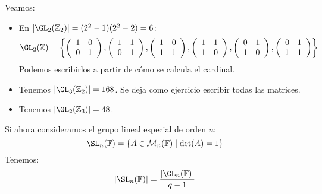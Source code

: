 \begin{ejemplo}
    Veamos:
    \begin{itemize}
        \item En $|\GL_2(\mathbb{Z}_2)| = (2^2 - 1)(2^2-2) = 6$:
            \begin{equation*}
                \GL_2(\mathbb{Z}) = \left\{\left(\begin{array}{cc}
                    1 & 0 \\
                    0 & 1 
                \end{array}\right), \left(\begin{array}{cc}
                    1 & 1 \\
                    0 & 1 
                \end{array}\right),\left(\begin{array}{cc}
                    1 & 0 \\
                    1 & 1 
                \end{array}\right), \left(\begin{array}{cc}
                    1 & 1 \\
                    1 & 0 
                \end{array}\right),\left(\begin{array}{cc}
                    0 & 1 \\
                    1 & 0 
                \end{array}\right), \left(\begin{array}{cc}
                    0 & 1 \\
                    1 & 1 
                \end{array}\right)\right\}
            \end{equation*}
            Podemos escribirlos a partir de cómo se calcula el cardinal.
        \item Tenemos $|\GL_3(\mathbb{Z}_2)| = 168$. Se deja como ejercicio escribir todas las matrices.
        \item Tenemos $|\GL_2(\mathbb{Z}_3)| = 48$.
    \end{itemize}
\end{ejemplo}

Si ahora consideramos el grupo lineal especial de orden $n$:
\begin{equation*}
    \SL_n(\mathbb{F}) = \{A \in \mathcal{M}_n(\mathbb{F}) \mid \det(A) = 1\}
\end{equation*}
Tenemos:
\begin{equation*}
    |\SL_n(\mathbb{F})| = \dfrac{|\GL_n(\mathbb{F})|}{q-1}
\end{equation*}

